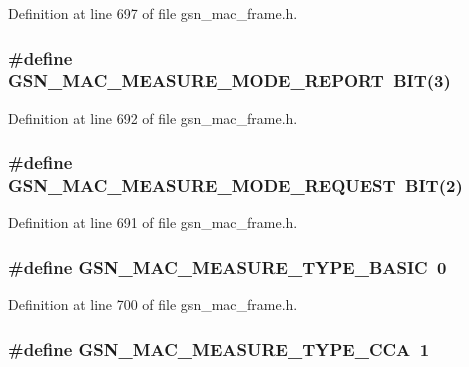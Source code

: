 Definition at line 697 of file gsn\_\-mac\_\-frame.h.

\hypertarget{a00523_a1c86b9077e37a8713189a0fe5a46998a}{
\subsubsection[{GSN\_\-MAC\_\-MEASURE\_\-MODE\_\-REPORT}]{\setlength{\rightskip}{0pt plus 5cm}\#define GSN\_\-MAC\_\-MEASURE\_\-MODE\_\-REPORT~BIT(3)}}
\label{a00523_a1c86b9077e37a8713189a0fe5a46998a}


Definition at line 692 of file gsn\_\-mac\_\-frame.h.

\hypertarget{a00523_a4711dc61384764f10440570be53226ec}{
\subsubsection[{GSN\_\-MAC\_\-MEASURE\_\-MODE\_\-REQUEST}]{\setlength{\rightskip}{0pt plus 5cm}\#define GSN\_\-MAC\_\-MEASURE\_\-MODE\_\-REQUEST~BIT(2)}}
\label{a00523_a4711dc61384764f10440570be53226ec}


Definition at line 691 of file gsn\_\-mac\_\-frame.h.

\hypertarget{a00523_a4f9b3ffcf6edbe4903e13cca181e66e1}{
\subsubsection[{GSN\_\-MAC\_\-MEASURE\_\-TYPE\_\-BASIC}]{\setlength{\rightskip}{0pt plus 5cm}\#define GSN\_\-MAC\_\-MEASURE\_\-TYPE\_\-BASIC~0}}
\label{a00523_a4f9b3ffcf6edbe4903e13cca181e66e1}


Definition at line 700 of file gsn\_\-mac\_\-frame.h.

\hypertarget{a00523_a0ef016e277536b17262a24c166904ae8}{
\subsubsection[{GSN\_\-MAC\_\-MEASURE\_\-TYPE\_\-CCA}]{\setlength{\rightskip}{0pt plus 5cm}\#define GSN\_\-MAC\_\-MEASURE\_\-TYPE\_\-CCA~1}}
\label{a00523_a0ef016e277536b17262a24c166904ae8}


